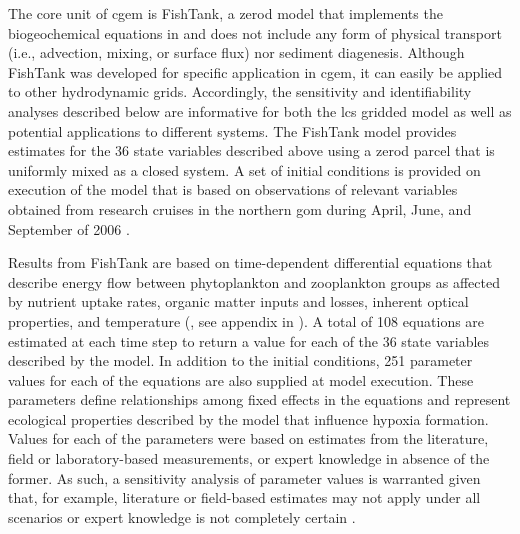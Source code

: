 \documentclass[letterpaper,12pt,oneside]{article}\usepackage[]{graphicx}\usepackage[]{color}
\begin{document}
The core unit of \ac{cgem} is FishTank, a \ac{zerod} model that implements the biogeochemical equations in \citet{Eldridge10} and does not include any form of physical transport (i.e., advection, mixing, or surface flux) nor sediment diagenesis.  Although FishTank was developed for specific application in \ac{cgem}, it can easily be applied to other hydrodynamic grids. Accordingly, the sensitivity and identifiability analyses described below are informative for both the \ac{lcs} gridded model as well as potential applications to different systems.  The FishTank model provides estimates for the 36 state variables described above using a \ac{zerod} parcel that is uniformly mixed as a closed system.  A set of initial conditions is provided on execution of the model that is based on observations of relevant variables obtained from research cruises in the northern \ac{gom} during April, June, and September of 2006 \citep[Table 1 in][]{Murrell14}. 

Results from FishTank are based on time-dependent differential equations that describe energy flow between phytoplankton and zooplankton groups as affected by nutrient uptake rates, organic matter inputs and losses, inherent optical properties, and temperature (\citealt{Penta08,Eldridge10}, see appendix in ).  A total of 108 equations are estimated at each time step to return a value for each of the 36 state variables described by the model.  In addition to the initial conditions, 251 parameter values for each of the equations are also supplied at model execution.  These parameters define relationships among fixed effects in the equations and represent ecological properties described by the model that influence hypoxia formation.  Values for each of the parameters were based on estimates from the literature, field or laboratory-based measurements, or expert knowledge in absence of the former.  As such, a sensitivity analysis of parameter values is warranted given that, for example, literature or field-based estimates may not apply under all scenarios or expert knowledge is not completely certain \citep{Refsgaard07}.

\end{document}
